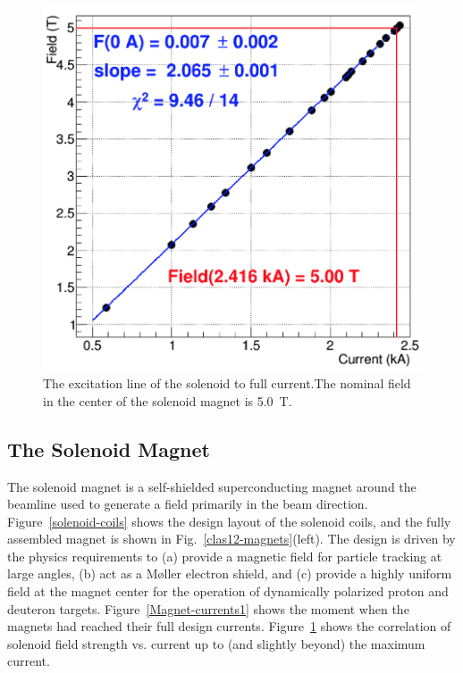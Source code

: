 \documentclass[final,3p]{elsarticle}
\begin{document}
\begin{twocolumn}
\begin{figure}[h!]
\centerline{\includegraphics[width=0.95\columnwidth]{Solenoid-current.png}}
\caption{The excitation line of the solenoid to full current.The nominal field in the center of the solenoid magnet
  is 5.0~T.}
\label{Magnet-currents2}
\end{figure}

\subsection{The Solenoid Magnet}

The solenoid magnet is a self-shielded superconducting magnet around the beamline used to generate a field primarily
in the beam direction. Figure~\ref{solenoid-coils} shows the design layout of the solenoid coils, and the fully assembled
magnet is shown in Fig.~\ref{clas12-magnets}(left). The design is driven by the physics requirements to (a) provide a
magnetic field for particle tracking at large angles, (b) act as a M{\o}ller electron shield, and (c) provide a highly
uniform field at the magnet center for the operation of dynamically polarized proton and deuteron targets.
Figure~\ref{Magnet-currents1} shows the moment when the magnets had reached their full design currents.
Figure~\ref{Magnet-currents2} shows the correlation of solenoid field strength vs. current up to (and slightly beyond)
the maximum current.


\end{twocolumn}
\end{document}
